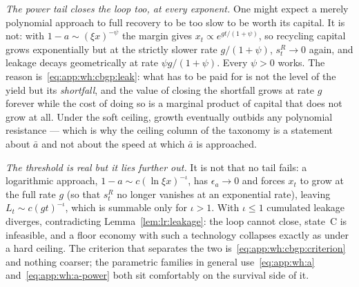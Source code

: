 \emph{The power tail closes the loop too, at every exponent.} One might expect a merely polynomial approach to full recovery to be too slow to be worth its capital. It is not: with $1-a\sim\left(\xi x\right)^{-\psi}$ the margin gives $x_t\propto e^{gt/\left(1+\psi\right)}$, so recycling capital grows exponentially but at the strictly slower rate $g/\left(1+\psi\right)$, $s^R_t\to0$ again, and leakage decays geometrically at rate $\psi g/\left(1+\psi\right)$. Every $\psi>0$ works. The reason is~\eqref{eq:app:wh:cbgp:leak}: what has to be paid for is not the level of the yield but its \emph{shortfall}, and the value of closing the shortfall grows at rate $g$ forever while the cost of doing so is a marginal product of capital that does not grow at all. Under the soft ceiling, growth eventually outbids any polynomial resistance --- which is why the ceiling column of the taxonomy is a statement about $\bar a$ and not about the speed at which $\bar a$ is approached.

\emph{The threshold is real but it lies further out.} It is not that no tail fails: a logarithmic approach, $1-a\sim c\left(\ln\xi x\right)^{-\iota}$, has $\epsilon_a\to0$ and forces $x_t$ to grow at the full rate $g$ (so that $s^R_t$ no longer vanishes at an exponential rate), leaving $L_t\sim c\left(gt\right)^{-\iota}$, which is summable only for $\iota>1$. With $\iota\le1$ cumulated leakage diverges, contradicting Lemma~\ref{lem:lr:leakage}: the loop cannot close, state~C is infeasible, and a floor economy with such a technology collapses exactly as under a hard ceiling. The criterion that separates the two is~\eqref{eq:app:wh:cbgp:criterion} and nothing coarser; the parametric families in general use~\eqref{eq:app:wh:a} and~\eqref{eq:app:wh:a-power} both sit comfortably on the survival side of it.

